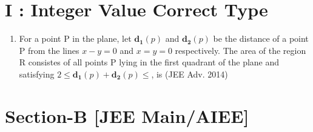 \documentclass[12pt]{article}
\let\vec\mathbf
\begin{document}
\section*{I    :     Integer Value Correct Type }
\begin{enumerate}
\item For a point P in the plane, let $\vec{d_1}(p)$ and $\vec{d_2}(p)$ be the distance of a point P
from the lines $x-y=0$ and $x=y=0$ respectively. The area of the region R consistes of all points P lying in the first quadrant of the plane and satisfying $2\leq \vec{d_1}(p)+\vec{d_2}(p)\leq$, is (JEE Adv. 2014)
\end{enumerate}

\section*{Section-B   [JEE Main/AIEE]}
\end{document}
